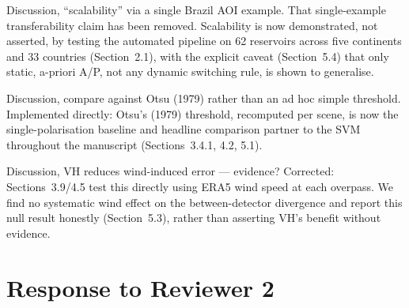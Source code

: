 \documentclass[11pt]{article}
\begin{document}
\begin{resp}
  \item[Discussion, ``scalability'' via a single Brazil AOI example.] That
  single-example transferability claim has been removed. Scalability is now
  demonstrated, not asserted, by testing the automated pipeline on 62
  reservoirs across five continents and 33 countries (Section~2.1), with the
  explicit caveat (Section~5.4) that only static, a-priori A/P, not any
  dynamic switching rule, is shown to generalise.
  \item[Discussion, compare against Otsu (1979) rather than an ad hoc simple
  threshold.] Implemented directly: Otsu's (1979) threshold, recomputed per
  scene, is now the single-polarisation baseline and headline comparison
  partner to the SVM throughout the manuscript (Sections~3.4.1, 4.2, 5.1).
  \item[Discussion, VH reduces wind-induced error --- evidence?] Corrected:
  Sections~3.9/4.5 test this directly using ERA5 wind speed at each
  overpass. We find no systematic wind effect on the between-detector
  divergence and report this null result honestly (Section~5.3), rather than
  asserting VH's benefit without evidence.
\end{resp}

\section*{Response to Reviewer 2}
\end{document}
